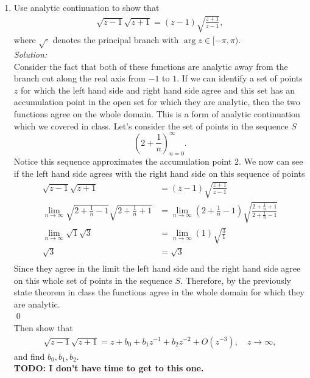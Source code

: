 \documentclass[10pt]{amsart}
\theoremstyle{nonumberplain}
\begin{document}
\begin{enumerate}[label={\bf {\arabic*}:}]
\item Use analytic continuation to show that
  \begin{align*}
    \sqrt{z -1} \sqrt{z + 1} = (z -1) \sqrt{ \frac{ z +1}{z-1}},
  \end{align*}
  where $\sqrt{\cdot}$ denotes the principal branch with $\arg z \in
  [-\pi, \pi)$. \\
  \textit{Solution:} \\
Consider the fact that both of these functions are analytic away from the branch cut along the real axis from $-1$ to $1$.
If we can identify a set of points $z$ for which the left hand side and right hand side agree and this set has an accumulation point in the open set for which they are analytic, then the two functions agree on the whole domain.
This is a form of analytic continuation which we covered in class.
Let's consider the set of points in the sequence $S$
$$
\left(2 + \frac 1 n \right)_{n = 0}^ \infty.
$$
Notice this sequence approximates the accumulation point $2$.
We now can see if the left hand side agrees with the right hand side on this sequence of points
\begin{align*}
\sqrt{z -1} \sqrt{z + 1} &= (z -1) \sqrt{ \frac{ z +1}{z-1}} \\
\lim_{n\rightarrow\infty} \sqrt{2 + \frac 1 n -1} \sqrt{2 + \frac 1 n + 1}
	&= \lim_{n\rightarrow\infty}\left(2 + \frac 1 n -1\right) \sqrt{ \frac{ 2 + \frac 1 n +1}{2 + \frac 1 n-1}} \\
\lim_{n\rightarrow\infty} \sqrt{1} \sqrt{3}
	&= \lim_{n\rightarrow\infty}(1)\sqrt{ \frac{ 3}{1}} \\
\sqrt{3} &= \sqrt{3} \\
\end{align*}
Since they agree in the limit the left hand side and the right hand side agree on this whole set of points in the sequence $S$.
Therefore, by the previously state theorem in class the functions agree in the whole domain for which they are analytic. \\
\qed \\
  
  \noindent
  Then show that
  \begin{align*}
    \sqrt{z -1} \sqrt{z + 1} = z + b_0 + b_1 z^{-1} + b_2  z^{-2} +
    O(z^{-3}), \quad z \to \infty,
  \end{align*}
  and find $b_0,b_1,b_2$. \\
  \textbf{TODO: I don't have time to get to this one.}
  
\end{enumerate}
\end{document}
